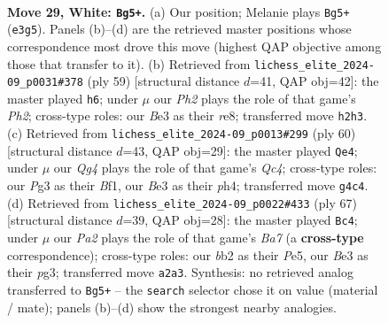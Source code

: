 \documentclass[11pt]{article}
\begin{document}
\clearpage

\begin{figure}[p]\centering
\begin{subfigure}{0.46\textwidth}\centering
\resizebox{\linewidth}{!}{%
\newchessgame
\chessboard[
  setfen={r7/2p1k1pp/3p4/8/pP4Q1/4B1P1/Pb3PKP/1q6 w - - 3 29},
  showmover=false,
  pgfstyle=straightmove, color=movearrow, markmove={e3-g5}
]}
\caption{}
\end{subfigure}\hfill
\begin{subfigure}{0.46\textwidth}\centering
\resizebox{\linewidth}{!}{%
\newchessgame
\chessboard[
  setfen={4R3/1p3pkp/6p1/1P6/pqP3P1/2b4P/Q4P2/2K5 b - - 5 30},
  showmover=false,
  pgfstyle=straightmove, color=movearrow, markmove={h7-h6}
]}
\caption{}
\end{subfigure}
\\[4pt]
\begin{subfigure}{0.46\textwidth}\centering
\resizebox{\linewidth}{!}{%
\newchessgame
\chessboard[
  setfen={8/p4pk1/6p1/1P2p3/2Q4p/7P/P4PP1/q2b1BK1 w - - 0 31},
  showmover=false,
  pgfstyle=straightmove, color=movearrow, markmove={c4-e4}
]}
\caption{}
\end{subfigure}\hfill
\begin{subfigure}{0.46\textwidth}\centering
\resizebox{\linewidth}{!}{%
\newchessgame
\chessboard[
  setfen={8/5pkp/6p1/2P1p2q/1P2P2P/6P1/b2Q1PB1/6K1 b - - 0 34},
  showmover=false,
  pgfstyle=straightmove, color=movearrow, markmove={a2-c4}
]}
\caption{}
\end{subfigure}
\caption{\textbf{Move 29, White: \texttt{Bg5+}.} (a) Our position; Melanie plays \texttt{Bg5+} (\texttt{e3g5}). Panels (b)--(d) are the retrieved master positions whose correspondence most drove this move (highest QAP objective among those that transfer to it). (b) Retrieved from \texttt{lichess\_elite\_2024-09\_p0031\#378} (ply 59) [structural distance $d$=41, QAP obj=42]: the master played \texttt{h6}; under $\mu$ our \emph{Ph2} plays the role of that game's \emph{Ph2}; cross-type roles: our \emph{B}e3 as their \emph{r}e8; transferred move \texttt{h2h3}. (c) Retrieved from \texttt{lichess\_elite\_2024-09\_p0013\#299} (ply 60) [structural distance $d$=43, QAP obj=29]: the master played \texttt{Qe4}; under $\mu$ our \emph{Qg4} plays the role of that game's \emph{Qc4}; cross-type roles: our \emph{P}g3 as their \emph{B}f1, our \emph{B}e3 as their \emph{p}h4; transferred move \texttt{g4c4}. (d) Retrieved from \texttt{lichess\_elite\_2024-09\_p0022\#433} (ply 67) [structural distance $d$=39, QAP obj=28]: the master played \texttt{Bc4}; under $\mu$ our \emph{Pa2} plays the role of that game's \emph{Ba7} (a \textbf{cross-type} correspondence); cross-type roles: our \emph{b}b2 as their \emph{P}e5, our \emph{B}e3 as their \emph{p}g3; transferred move \texttt{a2a3}. Synthesis: no retrieved analog transferred to \texttt{Bg5+} -- the \texttt{search} selector chose it on value (material / mate); panels (b)--(d) show the strongest nearby analogies.}
\label{fig:thought-m56}
\end{figure}
\end{document}
